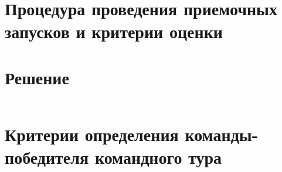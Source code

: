 \section{Процедура проведения приемочных запусков и
критерии оценки}



\section{Решение}
\inputminted[fontsize=\footnotesize, linenos]{js}{final/command_tour/irs/solution.js}

\section{Критерии определения команды-победителя командного тура}
